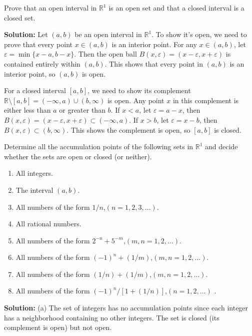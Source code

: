 \begin{problembox}
Prove that an open interval in $\mathbb{R}^1$ is an open set and that a closed interval is a closed set.
\end{problembox}

\textbf{Solution:} Let $(a,b)$ be an open interval in $\mathbb{R}^1$. To show it's open, we need to prove that every point $x \in (a,b)$ is an interior point. For any $x \in (a,b)$, let $\varepsilon = \min\{x-a, b-x\}$. Then the open ball $B(x,\varepsilon) = (x-\varepsilon, x+\varepsilon)$ is contained entirely within $(a,b)$. This shows that every point in $(a,b)$ is an interior point, so $(a,b)$ is open.

For a closed interval $[a,b]$, we need to show its complement $\mathbb{R} \setminus [a,b] = (-\infty,a) \cup (b,\infty)$ is open. Any point $x$ in this complement is either less than $a$ or greater than $b$. If $x < a$, let $\varepsilon = a-x$, then $B(x,\varepsilon) = (x-\varepsilon, x+\varepsilon) \subset (-\infty,a)$. If $x > b$, let $\varepsilon = x-b$, then $B(x,\varepsilon) \subset (b,\infty)$. This shows the complement is open, so $[a,b]$ is closed.

\begin{problembox}
Determine all the accumulation points of the following sets in $\mathbb{R}^1$ and decide whether the sets are open or closed (or neither).
\begin{enumerate}[label=\textbf{(\alph*)}]
\item All integers.
\item The interval $(a, b)$.
\item All numbers of the form $1/n$,\quad $(n = 1, 2, 3, \dots)$.
\item All rational numbers.
\item All numbers of the form $2^{-n} + 5^{-m}$,\quad $(m, n = 1, 2, \dots)$.
\item All numbers of the form $(-1)^n + (1/m)$,\quad $(m, n = 1, 2, \dots)$.
\item All numbers of the form $(1/n) + (1/m)$,\quad $(m, n = 1, 2, \dots)$.
\item All numbers of the form $(-1)^n / [1 + (1/n)]$,\quad $(n = 1, 2, \dots)$
.
\end{enumerate}
\end{problembox}

\textbf{Solution:} 
(a) The set of integers has no accumulation points since each integer has a neighborhood containing no other integers. The set is closed (its complement is open) but not open.

